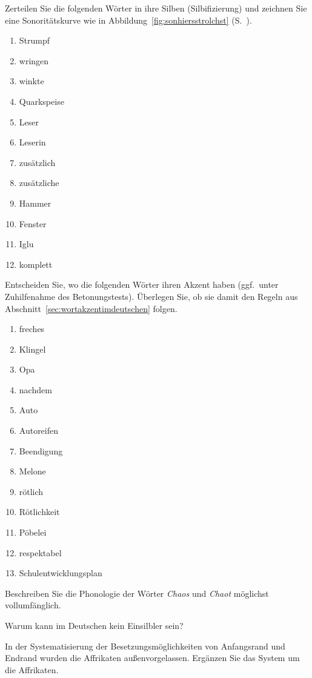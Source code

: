 \Uebung \label{u44} Zerteilen Sie die folgenden Wörter in ihre Silben (Silbifizierung) und zeichnen Sie eine Sonoritätskurve wie in Abbildung~\ref{fig:sonhiersstrolchst} (S.~\pageref{fig:sonhiersstrolchst}).

\begin{enumerate}\Lf
  \item Strumpf
  \item wringen
  \item winkte
  \item Quarkspeise
  \item Leser
  \item Leserin
  \item zusätzlich
  \item zusätzliche
  \item Hammer
  \item Fenster
  \item Iglu
  \item komplett
\end{enumerate}

\Uebung \label{u45} Entscheiden Sie, wo die folgenden Wörter ihren Akzent haben (ggf.\ unter Zuhilfenahme des Betonungstests).
Überlegen Sie, ob sie damit den Regeln aus Abschnitt~\ref{sec:wortakzentimdeutschen} folgen.

\begin{enumerate}\Lf
  \item freches
  \item Klingel
  \item Opa
  \item nachdem
  \item Auto
  \item Autoreifen
  \item Beendigung
  \item Melone
  \item rötlich
  \item Rötlichkeit
  \item Pöbelei
  \item respektabel
  \item Schulentwicklungsplan
\end{enumerate}

\Uebung[\tristar] \label{u46} Beschreiben Sie die Phonologie der Wörter \textit{Chaos} und \textit{Chaot} möglichst vollumfänglich.

\Uebung \label{u47} Warum kann \textipa{[s5]} im Deutschen kein Einsilbler sein?

\Uebung[\tristar] \label{u48} In der Systematisierung der Besetzungsmöglichkeiten von Anfangsrand und Endrand wurden die Affrikaten außenvorgelassen.
Ergänzen Sie das System um die Affrikaten.

